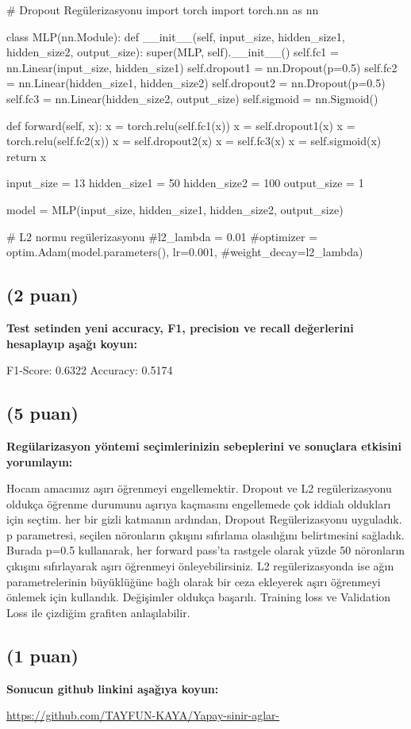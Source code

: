 \documentclass[11pt]{article}
\begin{document}
\begin{python}
# Dropout Regülerizasyonu
import torch
import torch.nn as nn

class MLP(nn.Module):
    def __init__(self, input_size, hidden_size1, hidden_size2, output_size):
        super(MLP, self).__init__()
        self.fc1 = nn.Linear(input_size, hidden_size1)
        self.dropout1 = nn.Dropout(p=0.5)
        self.fc2 = nn.Linear(hidden_size1, hidden_size2)
        self.dropout2 = nn.Dropout(p=0.5)
        self.fc3 = nn.Linear(hidden_size2, output_size)
        self.sigmoid = nn.Sigmoid()
        
    def forward(self, x):
        x = torch.relu(self.fc1(x))
        x = self.dropout1(x)
        x = torch.relu(self.fc2(x))
        x = self.dropout2(x)
        x = self.fc3(x)
        x = self.sigmoid(x)
        return x
        
input_size = 13
hidden_size1 = 50
hidden_size2 = 100
output_size = 1

model = MLP(input_size, hidden_size1, hidden_size2, output_size)

# L2 normu regülerizasyonu
#l2_lambda = 0.01
#optimizer = optim.Adam(model.parameters(), lr=0.001, #weight_decay=l2_lambda)
\end{python}

\subsection{(2 puan)} \textbf{Test setinden yeni accuracy, F1, precision ve recall değerlerini hesaplayıp aşağı koyun:}

F1-Score: 0.6322
Accuracy: 0.5174

\subsection{(5 puan)} \textbf{Regülarizasyon yöntemi seçimlerinizin sebeplerini ve sonuçlara etkisini yorumlayın:}

Hocam amacımız aşırı öğrenmeyi engellemektir. Dropout ve L2 regülerizasyonu oldukça öğrenme durumunu aşırıya kaçmasını engellemede çok iddialı oldukları için seçtim. her bir gizli katmanın ardından, Dropout Regülerizasyonu uyguladık. p parametresi, seçilen nöronların çıkışını sıfırlama olasılığını belirtmesini sağladık. Burada p=0.5 kullanarak, her forward pass'ta rastgele olarak yüzde 50 nöronların çıkışını sıfırlayarak aşırı öğrenmeyi önleyebilirsiniz. 
L2 regülerizasyonda ise ağın parametrelerinin büyüklüğüne bağlı olarak bir ceza ekleyerek aşırı öğrenmeyi önlemek için kullandık. Değişimler oldukça başarılı. Training loss ve Validation Loss ile çizdiğim grafiten anlaşılabilir.

\subsection{(1 puan)} \textbf{Sonucun github linkini  aşağıya koyun:}

\url{https://github.com/TAYFUN-KAYA/Yapay-sinir-aglar-}
\end{document}
